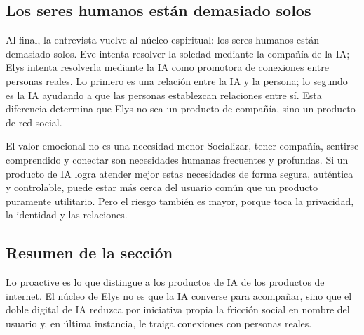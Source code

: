 \subsection{Los seres humanos están demasiado solos}

Al final, la entrevista vuelve al núcleo espiritual: los seres humanos están demasiado solos. Eve intenta resolver la soledad mediante la compañía de la IA; Elys intenta resolverla mediante la IA como promotora de conexiones entre personas reales. Lo primero es una relación entre la IA y la persona; lo segundo es la IA ayudando a que las personas establezcan relaciones entre sí. Esta diferencia determina que Elys no sea un producto de compañía, sino un producto de red social.

\begin{warningbox}{El valor emocional no es una necesidad menor}
Socializar, tener compañía, sentirse comprendido y conectar son necesidades humanas frecuentes y profundas. Si un producto de IA logra atender mejor estas necesidades de forma segura, auténtica y controlable, puede estar más cerca del usuario común que un producto puramente utilitario. Pero el riesgo también es mayor, porque toca la privacidad, la identidad y las relaciones.\end{warningbox}

\subsection{Resumen de la sección}

Lo proactive es lo que distingue a los productos de IA de los productos de internet. El núcleo de Elys no es que la IA converse para acompañar, sino que el doble digital de IA reduzca por iniciativa propia la fricción social en nombre del usuario y, en última instancia, le traiga conexiones con personas reales.

